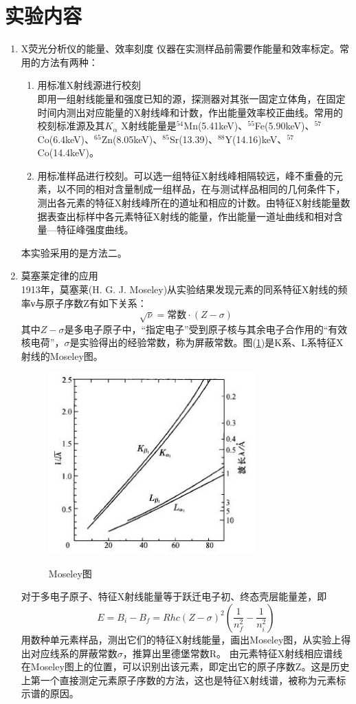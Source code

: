\documentclass[a4paper]{article}
\begin{document}
\section{实验内容}
\begin{enumerate}
\item X荧光分析仪的能量、效率刻度
仪器在实测样品前需要作能量和效率标定。常用的方法有两种：
\begin{enumerate}
\item 用标准X射线源进行校刻\\
即用一组射线能量和强度已知的源，探测器对其张一固定立体角，在固定时间内测出对应能量的X射线峰和计数，作出能量效率校正曲线。常用的校刻标准源及其$K_{\alpha}$ X射线能量是$^{54}$Mn(5.41keV)、$^{55}$Fe(5.90keV)、$^{57}$Co(6.4keV)、$^{65}$Zn(8.05keV)、$^{85}$Sr(13.39)、$^{88}$Y(14.16)keV、$^{57}$Co(14.4keV)。
\item 用标准样品进行校刻。可以选一组特征X射线峰相隔较远，峰不重叠的元素，以不同的相对含量制成一组样品，在与测试样品相同的几何条件下，测出各元素的特征X射线峰所在的道址和相应的计数。由特征X射线能量数据表查出标样中各元素特征X射线的能量，作出能量一道址曲线和相对含量—特征峰强度曲线。
\end{enumerate}
本实验采用的是方法二。
\item 莫塞莱定律的应用\\
1913年，莫塞莱(H. G. J. Moseley)从实验结果发现元素的同系特征X射线的频率ν与原子序数Z有如下关系：
\begin{equation}
\sqrt{\nu} = \text{常数}\cdot (Z-\sigma)\label{MoseleyEq1}
\end{equation}
其中$Z-\sigma$是多电子原子中，“指定电子”受到原子核与其余电子合作用的“有效核电荷”，$\sigma$是实验得出的经验常数，称为屏蔽常数。图(\ref{Moseley})是K系、L系特征X射线的Moseley图。
\begin{figure}[!h]
\centering
\includegraphics[width=8cm]{fig/Moseley.jpg}\\
\caption{Moseley图}\label{Moseley}
\end{figure}
对于多电子原子、特征X射线能量等于跃迁电子初、终态壳层能量差，即
\begin{equation}
E = B_i - B_f = Rhc(Z-\sigma)^2(\frac{1}{n_f^2} - \frac{1}{n_i^2})\label{MoseleyEq2}
\end{equation}
用数种单元素样品，测出它们的特征X射线能量，画出Moseley图，从实验上得出对应线系的屏蔽常数$\sigma$，推算出里德堡常数R。
由元素特征X射线相应谱线在Moseley图上的位置，可以识别出该元素，即定出它的原子序数Z。这是历史上第一个直接测定元素原子序数的方法，这也是特征X射线谱，被称为元素标示谱的原因。
\end{enumerate}
\end{document}
